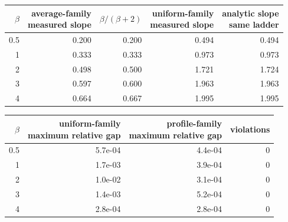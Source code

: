 {\fontsize{9}{11}\selectfont
\setlength{\tabcolsep}{6pt}
\begin{tabular}{rrrrr}
\toprule
$\beta$ & \thead{average-family\\measured slope} & $\beta/(\beta+2)$ & \thead{uniform-family\\measured slope} & \thead{analytic slope\\same ladder} \\
\midrule
0.5 & 0.200 & 0.200 & 0.494 & 0.494 \\
1 & 0.333 & 0.333 & 0.973 & 0.973 \\
2 & 0.498 & 0.500 & 1.721 & 1.724 \\
3 & 0.597 & 0.600 & 1.963 & 1.963 \\
4 & 0.664 & 0.667 & 1.995 & 1.995 \\
\bottomrule
\end{tabular}}
\par\bigskip
{\fontsize{9}{11}\selectfont
\setlength{\tabcolsep}{8pt}
\begin{tabular}{rrrr}
\toprule
$\beta$ & \thead{uniform-family\\maximum relative gap} & \thead{profile-family\\maximum relative gap} & violations \\
\midrule
0.5 & 5.7e-04 & 4.4e-04 & 0 \\
1 & 1.7e-03 & 3.9e-04 & 0 \\
2 & 1.0e-02 & 3.1e-04 & 0 \\
3 & 1.4e-03 & 5.2e-04 & 0 \\
4 & 2.8e-04 & 2.8e-04 & 0 \\
\bottomrule
\end{tabular}}
